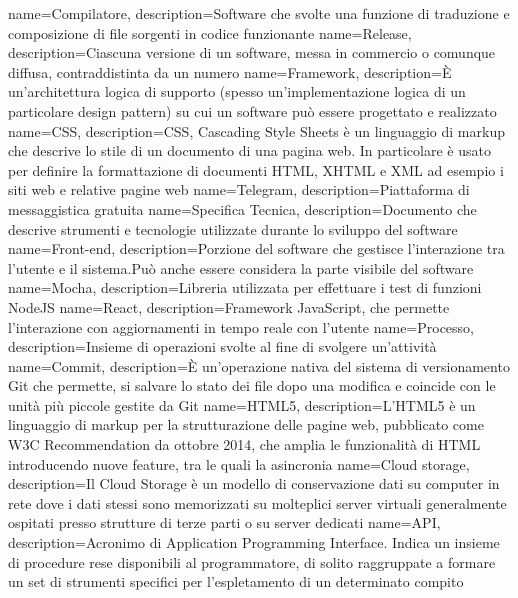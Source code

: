  {
	name=Compilatore,
	description={Software che svolte una funzione di traduzione e composizione di file sorgenti in codice funzionante}
}
 {
	name=Release,
	description={Ciascuna versione di un software, messa in commercio o comunque diffusa, contraddistinta da un numero}
}
 {
	name=Framework,
	description={È un'architettura logica di supporto (spesso un'implementazione logica di un particolare design pattern) su cui un software può essere progettato e realizzato}
}
 {
	name=CSS,
	description={CSS, Cascading Style Sheets è un linguaggio di markup che descrive lo stile di un documento di una pagina web. In particolare è usato per definire la formattazione di documenti HTML, XHTML e XML ad esempio i siti web e relative pagine web}
}
 {
	name=Telegram,
	description={Piattaforma di messaggistica gratuita}
}
 {
	name=Specifica Tecnica,
	description={Documento che descrive strumenti e tecnologie utilizzate durante lo sviluppo del software}
}
 {
	name=Front-end,
	description={Porzione del software che gestisce l'interazione tra l'utente e il sistema.Può anche essere considera la parte visibile del software}
}
 {
	name=Mocha,
	description={Libreria utilizzata per effettuare i test di funzioni NodeJS}
}
 {
	name=React,
	description={Framework JavaScript, che permette l'interazione con aggiornamenti in tempo reale con l'utente}
}
 {
	name=Processo,
	description={Insieme di operazioni svolte al fine di svolgere un'attività}
}
 {
	name=Commit,
	description={È un'operazione nativa del sistema di versionamento Git che permette, si salvare lo stato dei file dopo una modifica e coincide con le unità più piccole gestite da Git}
}
 {
	name=HTML5,
	description={L'HTML5 è un linguaggio di markup per la strutturazione delle pagine web, pubblicato come W3C Recommendation da ottobre 2014, che amplia le funzionalità di HTML introducendo nuove feature, tra le quali la asincronia}
}
 {
	name=Cloud storage,
	description={Il Cloud Storage è un modello di conservazione dati su computer in rete dove i dati stessi sono memorizzati su molteplici server virtuali generalmente ospitati presso strutture di terze parti o su server dedicati}
}
 {
	name=API,
	description={Acronimo di Application Programming Interface. Indica un insieme di procedure rese disponibili al programmatore, di solito raggruppate a formare un set di strumenti specifici per l'espletamento di un determinato compito}
}
